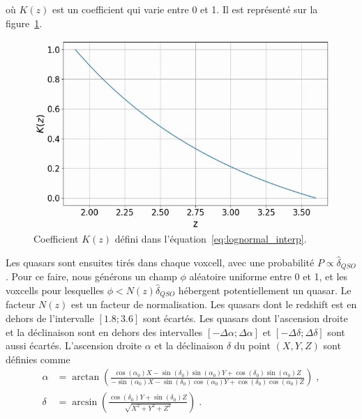 \documentclass[11pt, twoside, a4paper, openright]{report}
\begin{document}
où $K(z)$ est un coefficient qui varie entre 0 et 1. Il est représenté sur la figure~\ref{fig:kz}.
\begin{figure}
  \centering
  \label{fig:kz}
  \includegraphics[scale=0.4]{kz}
  \caption{Coefficient $K(z)$ défini dans l'équation~\ref{eq:lognormal_interp}.}
\end{figure}
Les quasars sont ensuites tirés dans chaque voxcell, avec une probabilité $P \propto \hat \delta_{QSO}$. Pour ce faire, nous générons un champ $\phi$ aléatoire uniforme entre 0 et 1, et les voxcells pour lesquelles $\phi < N(z) \hat \delta_{QSO}$ hébergent potentiellement un quasar. Le facteur $N(z)$ est un facteur de normalisation. Les quasars dont le redshift est en dehors de l'intervalle $[\num{1.8}; \num{3.6}]$ sont écartés.
Les quasars dont l'ascension droite et la déclinaison sont en dehors des intervalles $[ - \Delta \alpha ; \Delta \alpha]$ et $[ - \Delta \delta ; \Delta \delta]$ sont aussi écartés.
L'ascension droite $\alpha$ et la déclinaison $\delta$ du point $(X,Y,Z)$ sont définies comme
\begin{align}
  \label{eq:radec}
  \alpha &= \arctan(\frac{
  \cos(\alpha_0)X - \sin(\delta_0)\sin(\alpha_0)Y + \cos(\delta_0)\sin(\alpha_0)Z
  }{
  - \sin(\alpha_0)X - \sin(\delta_0)\cos(\alpha_0)Y + \cos(\delta_0)\cos(\alpha_0)Z
           }) \; ,\\
  \delta &= \arcsin(\frac{
           \cos(\delta_0)Y + \sin(\delta_0) Z
           }{
           \sqrt{X^2 + Y^2 + Z^2}
           }) \; .
\end{align}
\end{document}
